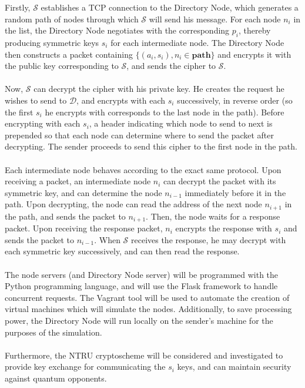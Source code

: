 \documentclass[10pt]{article}
\begin{document}
Firstly, $\mathcal{S}$ establishes a TCP connection to the Directory Node,
which generates a random path of nodes through which $\mathcal{S}$ will send
his message. For each node $n_i$ in the list, the Directory Node negotiates
with the corresponding $p_i$, thereby producing symmetric keys $s_i$ for each
intermediate node. The Directory Node then constructs a packet containing
$\{(a_i, s_i), n_i \in \mathbf{path}\}$ and encrypts it with the public key
corresponding to $\mathcal{S}$, and sends the cipher to $\mathcal{S}$.\\\\
Now, $\mathcal{S}$ can decrypt the cipher with his private key. He creates the
request he wishes to send to $\mathcal{D}$, and encrypts with each $s_i$
successively, in reverse order (so the first $s_i$ he encrypts with corresponds
to the last node in the path). Before encrypting with each $s_i$, a header
indicating which node to send to next is prepended so that each node can
determine where to send the packet after decrypting. The sender proceeds to
send this cipher to the first node in the path.\\\\
Each intermediate node behaves according to the exact same protocol. Upon
receiving a packet, an intermediate node $n_i$ can decrypt the packet with its
symmetric key, and can determine the node $n_{i-1}$ immediately before it in
the path. Upon decrypting, the node can read the address of the next node $n_{i+1}$
in the path, and sends the packet to $n_{i+1}$. Then, the node waits for a response packet. Upon receiving the response packet, $n_i$ encrypts the response with $s_i$ and sends the packet to $n_{i-1}$.
When $\mathcal{S}$ receives the response, he may decrypt with each symmetric
key successively, and can then read the response.\\\\
The node servers (and Directory Node server) will be programmed with the Python
programming language, and will use the Flask framework to handle concurrent
requests. The Vagrant tool will be used to automate the creation of virtual
machines which will simulate the nodes. Additionally, to save processing power,
the Directory Node will run locally on the sender's machine for the purposes of
the simulation.\\\\
Furthermore, the NTRU cryptoscheme will be considered and investigated to
provide key exchange for communicating the $s_i$ keys, and can maintain
security against quantum opponents.
\end{document}
